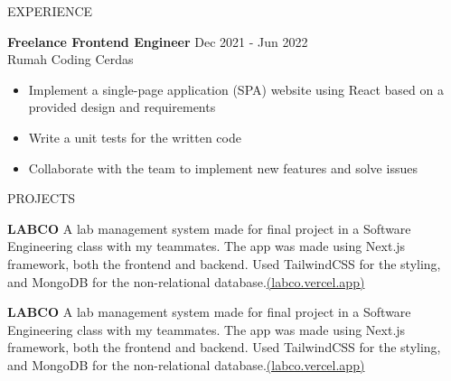 \documentclass{resume} %
\begin{document}
\begin{rSection}{EXPERIENCE}

\textbf{Freelance Frontend Engineer} \hfill Dec 2021 - Jun 2022\\
Rumah Coding Cerdas 
 \begin{itemize}
    \itemsep -3pt {} 
     \item Implement a single-page application (SPA) website using React based on a provided design and  requirements
     \item Write a unit tests for the written code
    \item Collaborate with the team to implement new features and solve issues
 \end{itemize}
 

\end{rSection} 


\begin{rSection}{PROJECTS}
\vspace{-1.25em}
\item \textbf{LABCO} {A lab management system made for final project in a Software Engineering class with my teammates. The app was made using Next.js framework, both the frontend and backend. Used TailwindCSS for the styling, and MongoDB for the non-relational database.\href{https://labco.vercel.app/}{(labco.vercel.app)}}
\item \textbf{LABCO} {A lab management system made for final project in a Software Engineering class with my teammates. The app was made using Next.js framework, both the frontend and backend. Used TailwindCSS for the styling, and MongoDB for the non-relational database.\href{https://labco.vercel.app/}{(labco.vercel.app)}}
\end{rSection} 
\end{document}
